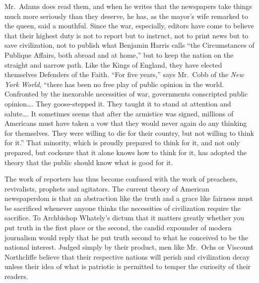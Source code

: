 \documentclass[openany,nobib,nohyper]{tufte-book}
\begin{document}
Mr.~Adams does read them, and when he writes that the newspapers take
things much more seriously than they deserve, he has, as the mayor's
wife remarked to the queen, said a mouthful. Since the war, especially,
editors have come to believe that their highest duty is not to report
but to instruct, not to print news but to save civilization, not to
publish what Benjamin Harris calls ``the Circumstances of Publique
Affairs, both abroad and at home,'' but to keep the nation on the
straight and narrow path. Like the Kings of England, they have elected
themselves Defenders of the Faith. ``For five years,'' says Mr.~Cobb of
the \emph{New York World}, ``there has been no free play of public
opinion in the world. Confronted by the inexorable necessities of war,
governments conscripted public opinion\ldots. They goose-stepped it.
They taught it to stand at attention and salute\ldots. It sometimes
seems that after the armistice was signed, millions of Americans must
have taken a vow that they would never again do any thinking for
themselves. They were willing to die for their country, but not willing
to think for it.'' That minority, which is proudly prepared to think for
it, and not only prepared, but cocksure that it alone knows how to think
for it, has adopted the theory that the public should know what is good
for it.

The work of reporters has thus become confused with the work of
preachers, revivalists, prophets and agitators. The current theory of
American newspaperdom is that an abstraction like the truth and a grace
like fairness must be sacrificed whenever anyone thinks the necessities
of civilization require the sacrifice. To Archbishop Whately's dictum
that it matters greatly whether you put truth in the first place or the
second, the candid expounder of modern journalism would reply that he
put truth second to what he conceived to be the national interest.
Judged simply by their product, men like Mr.~Ochs or Viscount
Northcliffe believe that their respective nations will perish and
civilization decay unless their idea of what is patriotic is permitted
to temper the curiosity of their readers.
\end{document}
